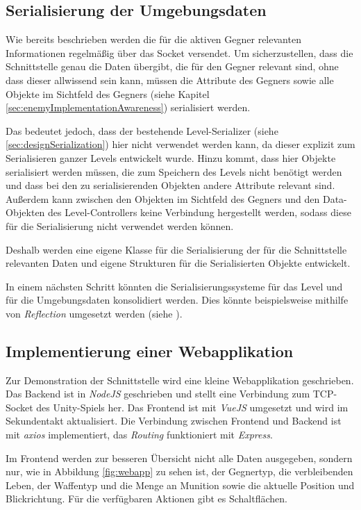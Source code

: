 \subsection{Serialisierung der Umgebungsdaten}\label{sec:interfaceSerialization}

Wie bereits beschrieben werden die für die aktiven Gegner relevanten Informationen regelmäßig über das Socket versendet. Um sicherzustellen, dass die Schnittstelle genau die Daten übergibt, die für den Gegner relevant sind, ohne dass dieser allwissend sein kann, müssen die Attribute des Gegners sowie alle Objekte im Sichtfeld des Gegners (siehe Kapitel \ref{sec:enemyImplementationAwareness}) serialisiert werden. 

Das bedeutet jedoch, dass der bestehende Level-Serializer (siehe \ref{sec:designSerialization}) hier nicht verwendet werden kann, da dieser explizit zum Serialisieren ganzer Levels entwickelt wurde. Hinzu kommt, dass hier Objekte serialisiert werden müssen, die zum Speichern des Levels nicht benötigt werden und dass bei den zu serialisierenden Objekten andere Attribute relevant sind. Außerdem kann zwischen den Objekten im Sichtfeld des Gegners und den Data-Objekten des Level-Controllers keine Verbindung hergestellt werden, sodass diese für die Serialisierung nicht verwendet werden können.

Deshalb werden eine eigene Klasse für die Serialisierung der für die Schnittstelle relevanten Daten und eigene Strukturen für die Serialisierten Objekte entwickelt.

In einem nächsten Schritt könnten die Serialisierungssysteme für das Level und für die Umgebungsdaten konsolidiert werden. Dies könnte beispielsweise mithilfe von \textit{Reflection} umgesetzt werden (siehe \cite{Reflection}).

\subsection{Implementierung einer Webapplikation}\label{sec:interfaceExample}

Zur Demonstration der Schnittstelle wird eine kleine Webapplikation geschrieben. Das Backend ist in \textit{NodeJS} geschrieben und stellt eine Verbindung zum TCP-Socket des Unity-Spiels her. Das Frontend ist mit \textit{VueJS} umgesetzt und wird im Sekundentakt aktualisiert. Die Verbindung zwischen Frontend und Backend ist mit \textit{axios} implementiert, das \textit{Routing} funktioniert mit \textit{Express}.

Im Frontend werden zur besseren Übersicht nicht alle Daten ausgegeben, sondern nur, wie in Abbildung \ref{fig:webapp} zu sehen ist, der Gegnertyp, die verbleibenden Leben, der Waffentyp und die Menge an Munition sowie die aktuelle Position und Blickrichtung. Für die verfügbaren Aktionen gibt es Schaltflächen.

